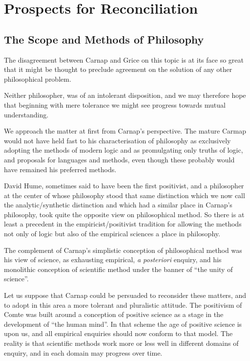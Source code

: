 \documentclass[10pt,titlepage]{book}
\begin{document}
\chapter{Prospects for Reconciliation}

\section{The Scope and Methods of Philosophy}

The disagreement between Carnap and Grice on this topic is at its face
so great that it might be thought to preclude agreement on the
solution of any other philosophical problem.

Neither philosopher, was of an intolerant disposition, and we may
therefore hope that beginning with mere tolerance we might see
progress towards mutual understanding.

We approach the matter at first from Carnap's perspective.
The mature Carmap would not have held fast to his characterisation of
philosophy as exclusively adopting the methods of modern logic and as
promulgating only truths of logic, and proposals for languages and
methods, even though these probably would have remained his preferred
methods.

David Hume, sometimes said to have been the first positivist, and a
philosopher at the center of whose philosophy stood that same
distinction which we now call the analytic/synthetic distinction and
which had a similar place in Carnap's philosophy, took quite the
opposite view on philosophical method.
So there is at least a precedent in the empiricist/positivist
tradition for allowing the methods not only of logic but also of the
empirical sciences a place in philosophy.

The complement of Carnap's simplistic conception of philosophical
method was his view of science, as exhausting empirical, \emph{a
  posteriori} enquiry, and his monolithic conception of scientific
method under the banner of ``the unity of science''.

Let us suppose that Carnap could be persuaded to reconsider these
matters, and to adopt in this area a more tolerant and pluralistic
attitude.
The positivism of Comte was built around a conception of positive
science as a stage in the development of ``the human mind''.
In that scheme the age of positive science is upon us, and all
empirical enquiries should now conform to that model.
The reality is that scientific methods work more or less well in
different domains of enquiry, and in each domain may progress over
time.
\end{document}
